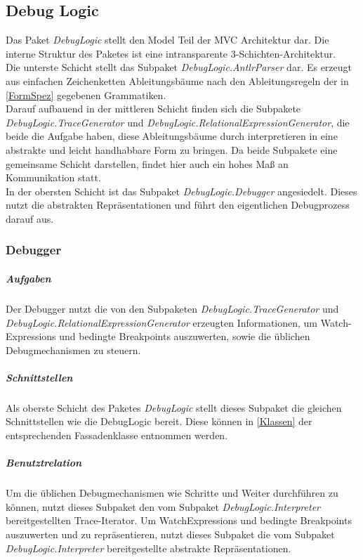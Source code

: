 \documentclass[parskip=full]{scrartcl}
\begin{document}
\subsection{Debug Logic}
Das Paket \textit{DebugLogic} stellt den Model Teil der MVC Architektur dar. Die interne Struktur des Paketes ist eine intransparente 3-Schichten-Architektur.\\
Die unterste Schicht stellt das Subpaket \textit{DebugLogic.AntlrParser} dar. Es erzeugt aus einfachen Zeichenketten Ableitungsbäume nach den Ableitungsregeln der in \ref{FormSpez} gegebenen Grammatiken.\\ Darauf aufbauend in der mittleren Schicht finden sich die Subpakete \textit{DebugLogic.TraceGenerator} und \textit{DebugLogic.RelationalExpressionGenerator}, die beide die Aufgabe haben, diese Ableitungsbäume durch interpretieren in eine abstrakte und leicht handhabbare Form zu bringen. Da beide Subpakete eine gemeinsame Schicht darstellen, findet hier auch ein hohes Maß an Kommunikation statt. \\ In der obersten Schicht ist das Subpaket \textit{DebugLogic.Debugger} angesiedelt. Dieses nutzt die abstrakten Repräsentationen und führt den eigentlichen Debugprozess darauf aus.
\subsubsection{Debugger}
\subparagraph{Aufgaben}
Der Debugger nutzt die von den Subpaketen \textit{DebugLogic.TraceGenerator} und \textit{DebugLogic.RelationalExpressionGenerator} erzeugten Informationen, um Watch-Expressions und bedingte Breakpoints auszuwerten, sowie die üblichen Debugmechanismen zu steuern.
\subparagraph{Schnittstellen}
Als oberste Schicht des Paketes \textit{DebugLogic} stellt dieses Subpaket die gleichen Schnittstellen wie die DebugLogic bereit. Diese können in \ref{Klassen} der entsprechenden Fassadenklasse entnommen werden.
\subparagraph{Benutztrelation} 


Um die üblichen Debugmechanismen wie Schritte und Weiter durchführen zu können, nutzt dieses Subpaket den vom Subpaket \textit{DebugLogic.Interpreter} bereitgestellten Trace-Iterator. 
Um WatchExpressions und bedingte Breakpoints auszuwerten und zu repräsentieren, nutzt dieses Subpaket die vom Subpaket \textit{DebugLogic.Interpreter} bereitgestellte abstrakte Repräsentationen.
\end{document}
